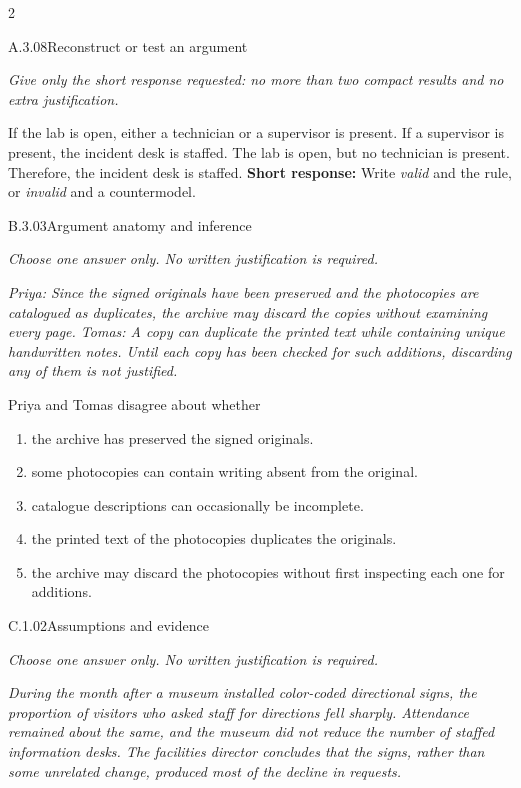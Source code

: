 \documentclass[9pt]{extarticle}
\newcommand{\choice}[1]{\item #1}
\begin{document}
\CoreWorkArea
\FormBreak
{}
\begin{multicols}{2}
\begin{DenseCoreProblem}{A.3.08}{Reconstruct or test an argument}
{\scriptsize\textit{Give only the short response requested: no more than two compact results and no extra justification.}\par}
If the lab is open, either a technician or a supervisor is present. If a supervisor is present, the incident desk is staffed. The lab is open, but no technician is present. Therefore, the incident desk is staffed.
\textbf{Short response:} Write \emph{valid} and the rule, or \emph{invalid} and a countermodel.
\end{DenseCoreProblem}
\begin{DenseCoreProblem}{B.3.03}{Argument anatomy and inference}
{\scriptsize\textit{Choose one answer only. No written justification is required.}\par}
\emph{Priya: Since the signed originals have been preserved and the photocopies are catalogued as duplicates, the archive may discard the copies without examining every page. Tomas: A copy can duplicate the printed text while containing unique handwritten notes. Until each copy has been checked for such additions, discarding any of them is not justified.}

Priya and Tomas disagree about whether
\begin{enumerate}[label=(\alph*)]
  \choice{the archive has preserved the signed originals.}
  \choice{some photocopies can contain writing absent from the original.}
  \choice{catalogue descriptions can occasionally be incomplete.}
  \choice{the printed text of the photocopies duplicates the originals.}
  \choice{the archive may discard the photocopies without first inspecting each one for additions.}
\end{enumerate}
\end{DenseCoreProblem}
\columnbreak
\begin{DenseCoreProblem}{C.1.02}{Assumptions and evidence}
{\scriptsize\textit{Choose one answer only. No written justification is required.}\par}
\emph{During the month after a museum installed color-coded directional signs, the proportion of visitors who asked staff for directions fell sharply. Attendance remained about the same, and the museum did not reduce the number of staffed information desks. The facilities director concludes that the signs, rather than some unrelated change, produced most of the decline in requests.}


\end{DenseCoreProblem}
\end{multicols}
\end{document}
